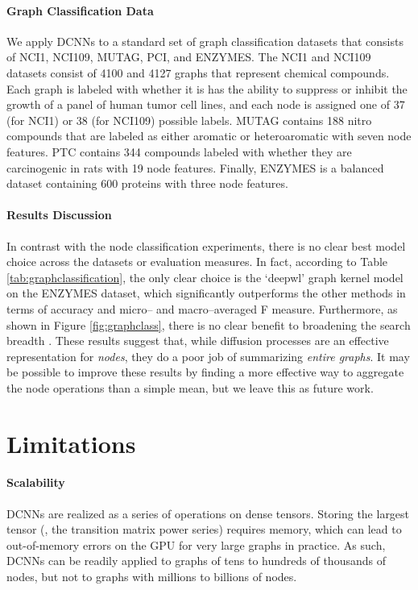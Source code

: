 \documentclass{article}
\begin{document}
\paragraph{Graph Classification Data} We apply DCNNs to a standard set of graph classification datasets that consists of NCI1, NCI109, MUTAG, PCI, and ENZYMES.  The NCI1 and NCI109 \cite{Wale:2007ec} datasets consist of 4100 and 4127 graphs that represent chemical compounds.  Each graph is labeled with whether it is has the ability to suppress or inhibit the growth of a panel of human tumor cell lines, and each node is assigned one of 37 (for NCI1) or 38 (for NCI109) possible labels. MUTAG \cite{debnath1991structure} contains 188 nitro compounds that are labeled as either aromatic or heteroaromatic with seven node features.  PTC \cite{toivonen2003statistical} contains 344 compounds labeled with whether they are carcinogenic in rats with 19 node features.  Finally, ENZYMES \cite{borgwardt2005protein} is a balanced dataset containing 600 proteins with three node features.

\paragraph{Results Discussion}
In contrast with the node classification experiments, there is no clear best model choice across the datasets or evaluation measures.  In fact, according to Table \ref{tab:graphclassification}, the only clear choice is the `deepwl' graph kernel model on the ENZYMES dataset, which significantly outperforms the other methods in terms of accuracy and micro-- and macro--averaged F measure.  Furthermore, as shown in Figure \ref{fig:graphclass}, there is no clear benefit to broadening the search breadth .  These results suggest that, while diffusion processes are an effective representation for \emph{nodes}, they do a poor job of summarizing \emph{entire graphs}.  It may be possible to improve these results by finding a more effective way to aggregate the node operations than a simple mean, but we leave this as future work.


\section{Limitations}
\label{sec:limitations}
\paragraph{Scalability}  DCNNs are realized as a series of operations on dense tensors.  Storing the largest tensor (, the transition matrix power series) requires  memory, which can lead to out-of-memory errors on the GPU for very large graphs in practice.  As such, DCNNs can be readily applied to graphs of tens to hundreds of thousands of nodes, but not to graphs with millions to billions of nodes.
\end{document}
